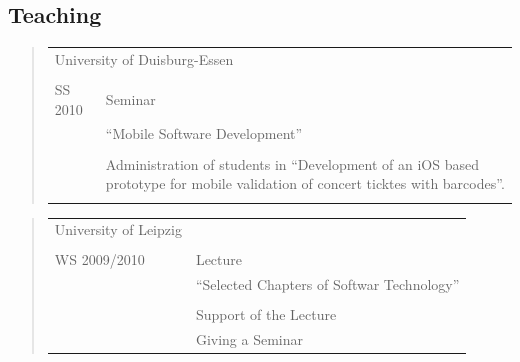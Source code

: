\subsection*{Teaching}
\ifshowLehreEssen
\begin{quote}
	\begin{tabular}{p{4cm}l}
		\multicolumn{2}{l}{University of Duisburg-Essen}\\\\
		SS 2010&Seminar\\
		&\qquad "`Mobile Software Development"'\\\\
		&\begin{minipage}{10cm}
		Administration of students in "`Development of an iOS based prototype for mobile validation of concert ticktes with barcodes"'.
		\end{minipage}\\\\
	\end{tabular}
\end{quote}
\fi
%
\ifshowLehreLeipzig
\begin{quote}
	\begin{tabular}{p{4cm}l}
		University of Leipzig\\\\
		WS 2009/2010&Lecture\\
		&\qquad "`Selected Chapters of Softwar Technology"'\\\\
		&Support of the Lecture\\
		&Giving a Seminar
	\end{tabular}
\end{quote}
\fi